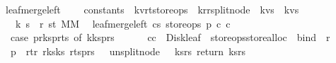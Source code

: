 \begin{isabellebody}
\isanewline
{}\isamarkupfalse%
\ leaf{\isacharunderscore}merge{\isacharunderscore}left\ {\isacharcolon}{\isacharcolon}\ \isanewline
\ \ {\isachardoublequoteopen}constants\ {\isasymRightarrow}\ {\isacharparenleft}{\isacharprime}k{\isacharcomma}{\isacharprime}v{\isacharcomma}{\isacharprime}r{\isacharcomma}{\isacharprime}t{\isacharparenright}store{\isacharunderscore}ops\ {\isasymRightarrow}\ {\isacharparenleft}{\isacharprime}k{\isacharcomma}{\isacharprime}r{\isacharparenright}rsplit{\isacharunderscore}node\ {\isasymRightarrow}\ {\isacharparenleft}{\isacharprime}k{\isacharasterisk}{\isacharprime}v{\isacharparenright}s\ {\isasymRightarrow}\ {\isacharparenleft}{\isacharprime}k{\isacharasterisk}{\isacharprime}v{\isacharparenright}s\ \isanewline
\ \ {\isasymRightarrow}\ {\isacharparenleft}{\isacharprime}k\ s\ {\isacharasterisk}\ {\isacharprime}r\ s{\isacharcomma}{\isacharprime}t{\isacharparenright}\ MM{\isachardoublequoteclose}\ \ \isanewline
{}\isanewline
{\isachardoublequoteopen}leaf{\isacharunderscore}merge{\isacharunderscore}left\ cs\ store{\isacharunderscore}ops\ p\ c{}\ c{}\ {\isacharequal}\ {\isacharparenleft}\isanewline
\ \ case\ {\isacharparenleft}p{\isacharbar}{\isachargreater}r{\isacharunderscore}ks{}{\isacharcomma}p{\isacharbar}{\isachargreater}r{\isacharunderscore}ts{}{\isacharparenright}\ of\ {\isacharparenleft}k{}{\isacharhash}ks{}{\isacharcomma}{\isacharunderscore}{\isacharhash}p{\isacharunderscore}rs{}{\isacharparenright}\ {\isasymRightarrow}\ \ \ \isanewline
\ \ {\isacharparenleft}c{}{\isacharat}c{}{\isacharparenright}\ {\isacharbar}{\isachargreater}\ Disk{\isacharunderscore}leaf\ {\isacharbar}{\isachargreater}\ {\isacharparenleft}store{\isacharunderscore}ops{\isacharbar}{\isachargreater}store{\isacharunderscore}alloc{\isacharparenright}\ {\isacharbar}{\isachargreater}\ bind\ {\isacharparenleft}{\isacharpercent}\ r{}{\isachardot}\isanewline
\ \ p\ {\isasymlparr}\ r{\isacharunderscore}t{\isacharcolon}{\isacharequal}r{}{\isacharcomma}\ r{\isacharunderscore}ks{}{\isacharcolon}{\isacharequal}ks{}{\isacharcomma}\ r{\isacharunderscore}ts{}{\isacharcolon}{\isacharequal}p{\isacharunderscore}rs{}\ {\isasymrparr}\ {\isacharbar}{\isachargreater}\ unsplit{\isacharunderscore}node\ {\isacharbar}{\isachargreater}\ {\isacharparenleft}{\isacharpercent}\ {\isacharparenleft}ks{\isacharcomma}rs{\isacharparenright}{\isachardot}\ return\ {\isacharparenleft}ks{\isacharcomma}rs{\isacharparenright}{\isacharparenright}{\isacharparenright}{\isacharparenright}{\isachardoublequoteclose}\isanewline

\end{isabellebody}
